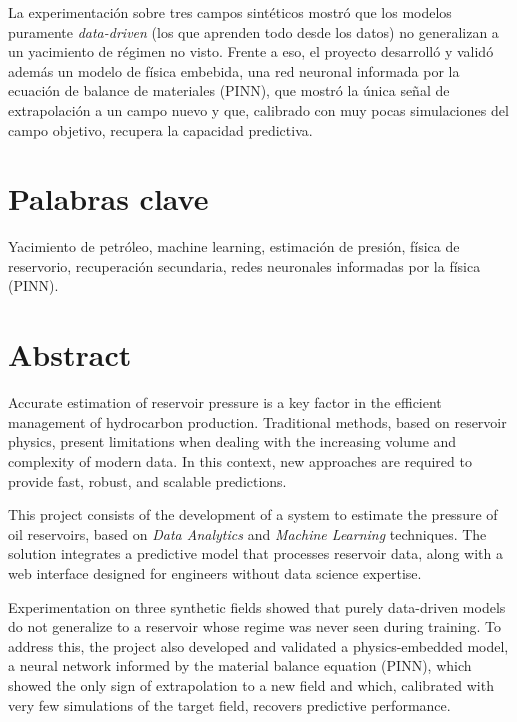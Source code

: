 \documentclass[12pt,a4paper]{article}
\begin{document}
La experimentación sobre tres campos sintéticos mostró que los modelos puramente
\textit{data-driven} (los que aprenden todo desde los datos) no generalizan a un
yacimiento de régimen no visto. Frente a eso, el
proyecto desarrolló y validó además un modelo de física embebida, una red neuronal
informada por la ecuación de balance de materiales (PINN), que mostró la única señal de
extrapolación a un campo nuevo y que, calibrado con muy pocas simulaciones del campo
objetivo, recupera la capacidad predictiva.


\newpage
\section{Palabras clave}

Yacimiento de petróleo, machine learning, estimación de presión, física de reservorio, recuperación secundaria, redes neuronales informadas por la física (PINN).

\newpage
\section{Abstract}

Accurate estimation of reservoir pressure is a key factor in the efficient management of hydrocarbon
production. Traditional methods, based on reservoir physics, present limitations when dealing with the
increasing volume and complexity of modern data. In this context, new approaches are required to provide
fast, robust, and scalable predictions.

This project consists of the development of a system to estimate the pressure of oil reservoirs,
based on \textit{Data Analytics} and \textit{Machine Learning} techniques.
The solution integrates a predictive model that processes reservoir data, along with a web interface designed for engineers without data science expertise.

Experimentation on three synthetic fields showed that purely data-driven models do not
generalize to a reservoir whose regime was never seen during training. To address this,
the project also developed and validated a physics-embedded model, a neural network
informed by the material balance equation (PINN), which showed the only sign of
extrapolation to a new field and which, calibrated with very few simulations of the
target field, recovers predictive performance.
\end{document}
